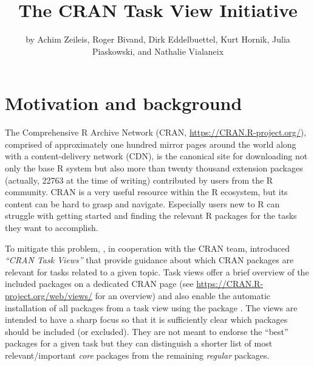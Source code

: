 \title{The CRAN Task View Initiative}


\author{by Achim Zeileis, Roger Bivand, Dirk Eddelbuettel, Kurt Hornik, Julia Piaskowski, and Nathalie Vialaneix}

\maketitle


\section{Motivation and background}\label{motivation-and-background}

The Comprehensive R Archive Network (CRAN, \url{https://CRAN.R-project.org/}), comprised
of approximately one hundred mirror pages around the world along with a content-delivery network (CDN), is the canonical site
for downloading not only the base R system \citep{r-base} but also more than twenty thousand extension packages
(actually, 22763 at the time of writing) contributed by users from
the R community. CRAN is a very useful resource within the R
ecosystem, but its content can be hard to grasp and navigate. Especially users new to R
can struggle with getting started and finding the relevant R packages for the
tasks they want to accomplish.

To mitigate this problem, \citet{ctv-intro}, in cooperation with the CRAN team, introduced
\emph{``CRAN Task Views''} that provide guidance about which CRAN packages
are relevant for tasks related to a given topic. Task views offer a brief overview of
the included packages on a dedicated CRAN page (see
\url{https://CRAN.R-project.org/web/views/} for an overview) and also enable the
automatic installation of all packages from a task view using the
 package \citep{ctv-pkg}. The views are intended to have a sharp focus so
that it is sufficiently clear which packages should be included (or excluded).
They are not meant to endorse the ``best'' packages for a given task but they can
distinguish a shorter list of most relevant/important \emph{core} packages from the
remaining \emph{regular} packages.


